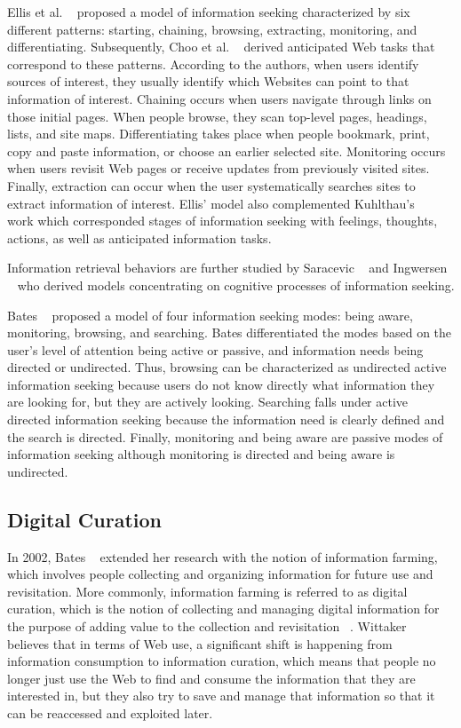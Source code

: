 \documentclass{casconpaper}
\begin{document}
{{Ellis et al. ~\cite{ellis1989, ellis1997, ellis1993} proposed a model of information seeking characterized by six different patterns: starting, chaining, browsing, extracting, monitoring, and differentiating. Subsequently, Choo et al. ~\cite{choo} derived anticipated Web tasks that correspond to these patterns. According to the authors, when users identify sources of interest, they usually identify which Websites can point to that information of interest.  Chaining occurs when users navigate through links on those initial pages. When people browse, they scan top-level pages, headings, lists, and site maps. Differentiating takes place when people bookmark, print, copy and paste information, or choose an earlier selected site. Monitoring occurs when users revisit Web pages or receive updates from previously visited sites. Finally, extraction can occur when the user systematically searches sites to extract information of interest. Ellis' model also complemented Kuhlthau's ~\cite{kuhlthau} work which corresponded stages of information seeking with feelings, thoughts, actions, as well as anticipated information tasks.

Information retrieval behaviors are further studied by Saracevic ~\cite{saracevic} and Ingwersen ~\cite{ingwersen} who derived models concentrating on cognitive processes of information seeking. 
 
Bates ~\cite{bates1986} proposed a model of four information seeking modes: being aware, monitoring, browsing, and searching. Bates differentiated the modes based on the user's level of attention being active or passive, and information needs being directed or undirected. Thus, browsing can be characterized as undirected active information seeking because users do not know directly what information they are looking for, but they are actively looking. Searching falls under active directed information seeking because the information need is clearly defined and the search is directed. Finally, monitoring and being aware are passive modes of information seeking although monitoring is directed and being aware is undirected.

} %
   
{\subsection{Digital Curation}

In 2002, Bates ~\cite{bates2002} extended her research with the notion of information farming, which involves people collecting and organizing information for future use and revisitation. More commonly, information farming is referred to as digital curation, which is the notion of collecting and managing digital information for the purpose of adding value to the collection and revisitation ~\cite{beagrie}. Wittaker ~\cite{wittaker} believes that in terms of Web use, a significant shift is happening from information consumption to information curation, which means that people no longer just use the Web to find and consume the information that they are interested in, but they also try to save and manage that information so that it can be reaccessed and exploited later. 

}}
\end{document}
